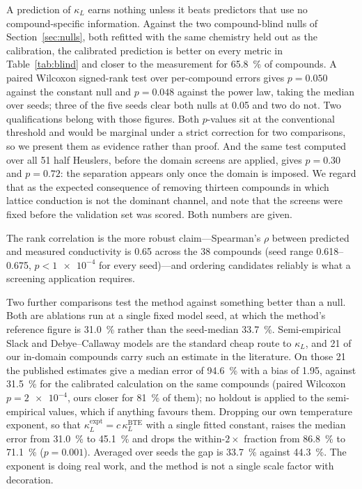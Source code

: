 A prediction of $\kappa_L$ earns nothing unless it beats predictors that use no compound-specific
information. Against the two compound-blind nulls of Section~\ref{sec:nulls}, both refitted with
the same chemistry held out as the calibration, the calibrated prediction is better on every metric
in Table~\ref{tab:blind} and closer to the measurement for \SI{65.8}{\percent} of compounds. A paired
Wilcoxon signed-rank test over per-compound errors gives $p=\num{0.050}$ against the constant null
and $p=\num{0.048}$ against the power law, taking the median over seeds; three of the five seeds
clear both nulls at \num{0.05} and two do not. Two qualifications belong with those figures. Both
$p$-values sit at the conventional threshold and would be marginal under a strict correction for
two comparisons, so we present them as evidence rather than proof. And the same test computed over
all \num{51} half Heuslers, before the domain screens are applied, gives $p=\num{0.30}$ and
$p=\num{0.72}$: the separation appears only once the domain is imposed. We regard that as the
expected consequence of removing thirteen compounds in which lattice conduction is not the dominant
channel, and note that the screens were fixed before the validation set was scored. Both numbers
are given.

The rank correlation is the more robust claim---Spearman's
$\rho$ between predicted and measured conductivity is \num{0.65} across the \num{38} compounds
(seed range \numrange{0.618}{0.675}, $p<\num{1e-4}$ for every seed)---and ordering candidates
reliably is what a screening application requires.

Two further comparisons test the method against something better than a null. Both are ablations run
at a single fixed model seed, at which the method's reference figure is \SI{31.0}{\percent} rather
than the seed-median \SI{33.7}{\percent}. Semi-empirical Slack and Debye--Callaway models are the standard cheap route to
$\kappa_L$, and \num{21} of our in-domain compounds carry such an estimate in the literature. On
those \num{21} the published estimates give a median error of \SI{94.6}{\percent} with a bias of
\num{1.95}, against \SI{31.5}{\percent} for the calibrated calculation on the same compounds
(paired Wilcoxon $p=\num{2e-4}$, ours closer for \SI{81}{\percent} of them); no holdout is applied
to the semi-empirical values, which if anything favours them. Dropping our own temperature exponent,
so that $\kappa_L^{\mathrm{expt}} = c\,\kappa_L^{\mathrm{BTE}}$ with a single fitted constant,
raises the median error from \SI{31.0}{\percent} to \SI{45.1}{\percent} and drops the
within-$2\times$ fraction from \SI{86.8}{\percent} to \SI{71.1}{\percent} ($p=\num{0.001}$).
Averaged over seeds the gap is \SI{33.7}{\percent} against \SI{44.3}{\percent}. The exponent is
doing real work, and the method is not a single scale factor with decoration.


